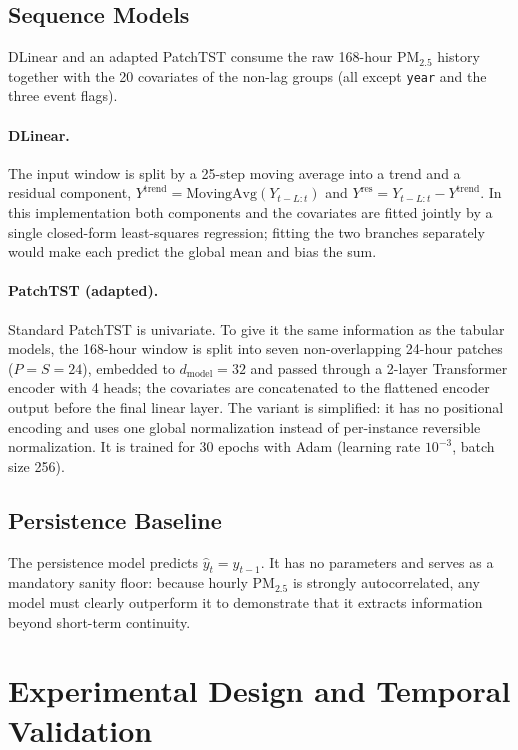 \subsection{Sequence Models}
\label{subsection:sequence-models}
DLinear \cite{zeng2023dlinear} and an adapted PatchTST \cite{nie2023} consume the raw 168-hour PM$_{2.5}$ history together with the 20 covariates of the non-lag groups (all except \texttt{year} and the three event flags).

\paragraph{DLinear.} The input window is split by a 25-step moving average into a trend and a residual component, $Y^{\text{trend}} = \text{MovingAvg}(Y_{t-L:t})$ and $Y^{\text{res}} = Y_{t-L:t} - Y^{\text{trend}}$. In this implementation both components and the covariates are fitted jointly by a single closed-form least-squares regression; fitting the two branches separately would make each predict the global mean and bias the sum.

\paragraph{PatchTST (adapted).} Standard PatchTST \cite{nie2023} is univariate. To give it the same information as the tabular models, the 168-hour window is split into seven non-overlapping 24-hour patches ($P=S=24$), embedded to $d_{\text{model}}=32$ and passed through a 2-layer Transformer encoder with 4 heads; the covariates are concatenated to the flattened encoder output before the final linear layer. The variant is simplified: it has no positional encoding and uses one global normalization instead of per-instance reversible normalization. It is trained for 30 epochs with Adam (learning rate $10^{-3}$, batch size 256).

\subsection{Persistence Baseline}
\label{subsection:persistence}
The persistence model predicts $\hat{y}_t = y_{t-1}$. It has no parameters and serves as a mandatory sanity floor: because hourly PM$_{2.5}$ is strongly autocorrelated, any model must clearly outperform it to demonstrate that it extracts information beyond short-term continuity.

\section{Experimental Design and Temporal Validation}
\label{section:experimental-design}

